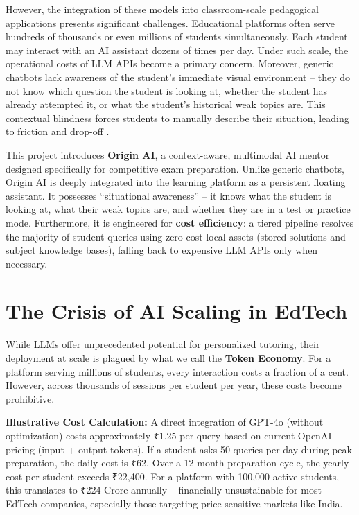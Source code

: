 However, the integration of these models into classroom-scale pedagogical applications presents significant challenges. Educational platforms often serve hundreds of thousands or even millions of students simultaneously. Each student may interact with an AI assistant dozens of times per day. Under such scale, the operational costs of LLM APIs become a primary concern. Moreover, generic chatbots lack awareness of the student's immediate visual environment – they do not know which question the student is looking at, whether the student has already attempted it, or what the student's historical weak topics are. This contextual blindness forces students to manually describe their situation, leading to friction and drop-off \cite{openai2024embeddings}.

This project introduces \textbf{Origin AI}, a context-aware, multimodal AI mentor designed specifically for competitive exam preparation. Unlike generic chatbots, Origin AI is deeply integrated into the learning platform as a persistent floating assistant. It possesses ``situational awareness'' – it knows what the student is looking at, what their weak topics are, and whether they are in a test or practice mode. Furthermore, it is engineered for \textbf{cost efficiency}: a tiered pipeline \cite{lewis2020retrieval} resolves the majority of student queries using zero-cost local assets (stored solutions and subject knowledge bases), falling back to expensive LLM APIs only when necessary.

\section{The Crisis of AI Scaling in EdTech}

While LLMs offer unprecedented potential for personalized tutoring, their deployment at scale is plagued by what we call the \textbf{Token Economy}. For a platform serving millions of students, every interaction costs a fraction of a cent. However, across thousands of sessions per student per year, these costs become prohibitive.

\textbf{Illustrative Cost Calculation:}  
A direct integration of GPT-4o (without optimization) costs approximately ₹1.25 per query based on current OpenAI pricing (input + output tokens). If a student asks 50 queries per day during peak preparation, the daily cost is ₹62. Over a 12-month preparation cycle, the yearly cost per student exceeds ₹22,400. For a platform with 100,000 active students, this translates to ₹224 Crore annually – financially unsustainable for most EdTech companies, especially those targeting price-sensitive markets like India.


